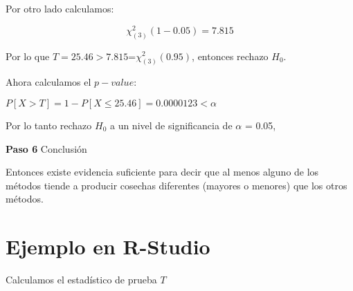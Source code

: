 \documentclass[
  a4paper,
  oneside,
  openany]{book}
\begin{document}
Por otro lado calculamos:

\[\chi_{(3)}^2(1-0.05)=7.815\]

Por lo que \(T=25.46 > 7.815\)=\(\chi_{(3)}^2(0.95)\), entonces rechazo \(H_0\).

Ahora calculamos el \(p-value\):

\(P[X>T]= 1-P[X\leq 25.46]=0.0000123 < \alpha\)

Por lo tanto rechazo \(H_0\) a un nivel de significancia de \(\alpha\) = 0.05,

\textbf{Paso 6} Conclusión

Entonces existe evidencia suficiente para decir que al menos alguno de los métodos tiende a producir cosechas diferentes (mayores o menores) que los otros métodos.

\hypertarget{ejemplo-en-r-studio-6}{%
\section{Ejemplo en R-Studio}\label{ejemplo-en-r-studio-6}}

Calculamos el estadístico de prueba \(T\)
\end{document}
